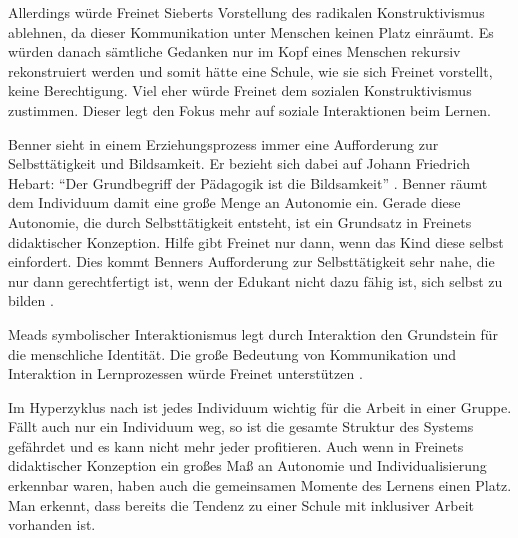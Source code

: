 Allerdings würde Freinet Sieberts Vorstellung des radikalen Konstruktivismus ablehnen, da dieser Kommunikation unter Menschen keinen Platz einräumt.
Es würden danach sämtliche Gedanken nur im Kopf eines Menschen rekursiv rekonstruiert werden \parencite[vgl.][10]{siebert-2003} und somit hätte eine Schule, wie sie sich Freinet vorstellt, keine Berechtigung.
Viel eher würde Freinet dem sozialen Konstruktivismus zustimmen.
Dieser legt den Fokus mehr auf soziale Interaktionen beim Lernen.

Benner sieht in einem Erziehungsprozess immer eine Aufforderung zur Selbsttätigkeit und Bildsamkeit.
Er bezieht sich dabei auf Johann Friedrich Hebart:
``Der Grundbegriff der Pädagogik ist die Bildsamkeit'' \parencite[70]{benner-2012}.
Benner räumt dem Individuum damit eine große Menge an Autonomie ein.
Gerade diese Autonomie, die durch Selbsttätigkeit entsteht, ist ein Grundsatz in Freinets didaktischer Konzeption.
Hilfe gibt Freinet nur dann, wenn das Kind diese selbst einfordert.
Dies kommt Benners Aufforderung zur Selbsttätigkeit sehr nahe, die nur dann gerechtfertigt ist, wenn der Edukant nicht dazu fähig ist, sich selbst zu bilden \parencite[vgl.][91]{benner-2012}.

Meads symbolischer Interaktionismus legt durch Interaktion den Grundstein für die menschliche Identität.
Die große Bedeutung von Kommunikation und Interaktion in Lernprozessen würde Freinet unterstützen \parencite[vgl.][109]{Freinet1979}.

Im Hyperzyklus nach \citeauthor{Zimpel2012} ist jedes Individuum wichtig für die Arbeit in einer Gruppe.
Fällt auch nur ein Individuum weg, so ist die gesamte Struktur des Systems gefährdet und es kann nicht mehr jeder profitieren.
Auch wenn in Freinets didaktischer Konzeption ein großes Maß an Autonomie und Individualisierung erkennbar waren, haben auch die gemeinsamen Momente des Lernens einen Platz.
Man erkennt, dass bereits die Tendenz zu einer Schule mit inklusiver Arbeit vorhanden ist.
